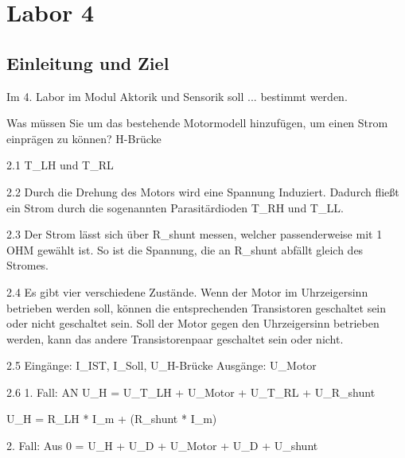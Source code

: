 \section{Labor 4}

\subsection{Einleitung und Ziel}

Im 4. Labor im Modul Aktorik und Sensorik soll ... bestimmt werden.


Was müssen Sie um das bestehende Motormodell hinzufügen, um einen Strom einprägen zu können?
H-Brücke

2.1
T_LH und T_RL

2.2 
Durch die Drehung des Motors wird eine Spannung Induziert. Dadurch fließt ein Strom durch die 
sogenannten Parasitärdioden T_RH und T_LL. 

2.3
Der Strom lässt sich über R_shunt messen, welcher passenderweise mit 1 OHM gewählt ist. So ist
die Spannung, die an R_shunt abfällt gleich des Stromes.

2.4
Es gibt vier verschiedene Zustände. Wenn der Motor im Uhrzeigersinn betrieben werden soll, können
die entsprechenden Transistoren geschaltet sein oder nicht geschaltet sein. Soll der Motor gegen
den Uhrzeigersinn betrieben werden, kann das andere Transistorenpaar geschaltet sein oder nicht.

2.5
Eingänge: I_IST, I_Soll, U_H-Brücke
Ausgänge: U_Motor

2.6
1. Fall: AN
    U_H = U_T_LH + U_Motor + U_T_RL + U_R_shunt

    U_H = R_LH * I_m + (R_shunt * I_m)  

2. Fall: Aus
    0 = U_H + U_D + U_Motor + U_D + U_shunt